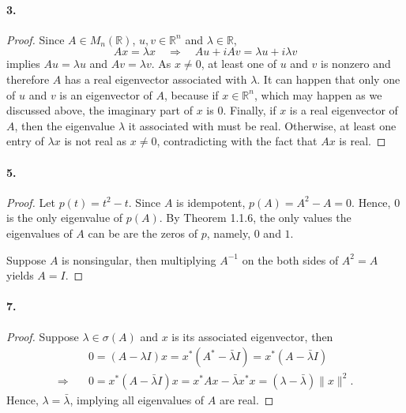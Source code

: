   \paragraph{3.}
  \begin{proof}
    Since $A\in M_n(\mathbb{R})$, $u,v\in\mathbb{R}^n$ and $\lambda\in
    \mathbb{R}$, 
    \[
      Ax=\lambda x\quad\Rightarrow\quad
      Au + iAv = \lambda u + i\lambda v
    \]
    implies $Au=\lambda u$ and $Av=\lambda v$. As $x\ne 0$, at least one of $u$
    and $v$ is nonzero and therefore $A$ has a real eigenvector associated with
    $\lambda$. It can happen that only one of $u$ and $v$ is an eigenvector of 
    $A$, because if $x\in\mathbb{R}^n$, which may happen as we discussed above,
    the imaginary part of $x$ is $0$. Finally, if $x$ is a real eigenvector of 
    $A$, then the eigenvalue $\lambda$ it associated with must be real. 
    Otherwise, at least one entry of $\lambda x$ is not real as $x\ne 0$, 
    contradicting with the fact that $Ax$ is real. 
  \end{proof}

  \paragraph{5.}
  \begin{proof}
    Let $p(t)=t^2-t$. Since $A$ is idempotent, $p(A)=A^2-A=0$. Hence, $0$ is the
    only eigenvalue of $p(A)$. By Theorem 1.1.6, the only values the eigenvalues
    of $A$ can be are the zeros of $p$, namely, $0$ and $1$. \par
    Suppose $A$ is nonsingular, then multiplying $A^{-1}$ on the both sides of
    $A^2=A$ yields $A=I$.
  \end{proof}

  \paragraph{7.}
  \begin{proof}
    Suppose $\lambda\in\sigma(A)$ and $x$ is its associated eigenvector, then
    \begin{align*}
       & 0 = (A-\lambda I)x = x^*(A^*-\bar{\lambda}I) = x^*(A-\bar{\lambda}I) \\
      \Rightarrow\quad&
      0 = x^*(A-\bar{\lambda}I)x = x^*Ax - \bar{\lambda}x^*x = 
      (\lambda-\bar{\lambda}) \|x\|^2.
    \end{align*}
    Hence, $\lambda=\bar{\lambda}$, implying all eigenvalues of $A$ are real.
  \end{proof}

